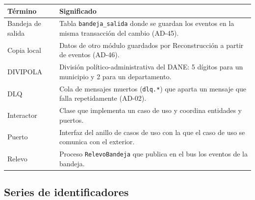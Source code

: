 \documentclass[11pt,a4paper]{article}
\begin{document}
{\small
\begin{longtable}{|P{3.4cm}|P{11.2cm}|}
  \hline
  \textbf{Término} & \textbf{Significado} \\ \hline
  \endhead
  Bandeja de salida & Tabla \texttt{bandeja\_salida} donde se guardan los eventos en la misma transacción del cambio
    (AD-45). \\ \hline
  Copia local & Datos de otro módulo guardados por Reconstrucción a partir de eventos (AD-46). \\ \hline
  DIVIPOLA & División político-administrativa del DANE: 5 dígitos para un municipio y 2 para un departamento. \\
    \hline
  DLQ & Cola de mensajes muertos (\texttt{dlq.*}) que aparta un mensaje que falla repetidamente (AD-02). \\ \hline
  Interactor & Clase que implementa un caso de uso y coordina entidades y puertos. \\ \hline
  Puerto & Interfaz del anillo de casos de uso con la que el caso de uso se comunica con el exterior. \\ \hline
  Relevo & Proceso \texttt{RelevoBandeja} que publica en el bus los eventos de la bandeja. \\ \hline
\end{longtable}
}

\subsection*{Series de identificadores}
\end{document}
